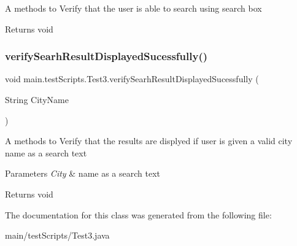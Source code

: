 A  methods to Verify that the user is able to search using search box \begin{DoxyReturn}{Returns}
void 
\end{DoxyReturn}
\mbox{\label{classmain_1_1test_scripts_1_1_test3_a1901c542d53d9249498e84984659df88}} 
\subsubsection{\texorpdfstring{verify\+Searh\+Result\+Displayed\+Sucessfully()}{verifySearhResultDisplayedSucessfully()}}
{\footnotesize\ttfamily void main.\+test\+Scripts.\+Test3.\+verify\+Searh\+Result\+Displayed\+Sucessfully (\begin{DoxyParamCaption}\item[{String}]{City\+Name }\end{DoxyParamCaption})}

A  methods to Verify that the results are displyed if user is given a valid city name as a search text 
\begin{DoxyParams}{Parameters}
{\em City} & name as a search text \\
\hline
\end{DoxyParams}
\begin{DoxyReturn}{Returns}
void 
\end{DoxyReturn}


The documentation for this class was generated from the following file\+:\begin{DoxyCompactItemize}
\item 
main/test\+Scripts/Test3.\+java\end{DoxyCompactItemize}
